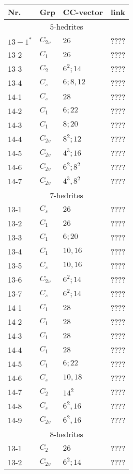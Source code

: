 \documentclass[12pt]{article}
\begin{document}
\begin{table}
\begin{center}
{\small
\begin{minipage}{6cm}
\begin{tabular}{||l|l|l|l||}
\hline
Nr.	&Grp 	&CC-vector	&link\\\hline
\multicolumn{4}{||c||}{$5$-hedrites}\\\hline
$13-1^*$&$C_{2v}$	&$26$		&????\\
13-2	&$C_1$	&$26$		&????\\
13-3	&$C_2$	&$6^2; 14$	&????\\
13-4	&$C_s$	&$6; 8, 12$	&????\\\hline
14-1	&$C_s$	&$28$		&????\\
14-2	&$C_1$	&$6; 22$		&????\\
14-3	&$C_1$	&$8; 20$		&????\\
14-4	&$C_{2v}$	&$8^2; 12$	&????\\
14-5	&$C_{2v}$	&$4^3; 16$	&????\\
14-6	&$C_{2v}$	&$6^2; 8^2$	&????\\
14-7	&$C_{2v}$	&$4^3, 8^2$	&????\\\hline
\hline
\multicolumn{4}{||c||}{$7$-hedrites}\\\hline
13-1	&$C_s$	&$26$		&????\\
13-2	&$C_1$	&$26$		&????\\
13-3	&$C_1$	&$6; 20$		&????\\
13-4	&$C_1$	&$10, 16$		&????\\
13-5	&$C_s$	&$10, 16$		&????\\
13-6	&$C_{2v}$	&$6^2; 14$	&????\\
13-7	&$C_{s}$	&$6^2; 14$	&????\\\hline
14-1	&$C_1$	&$28$		&????\\
14-2	&$C_1$	&$28$		&????\\
14-3	&$C_1$	&$28$		&????\\
14-4	&$C_1$	&$28$		&????\\
14-5	&$C_1$	&$6; 22$		&????\\
14-6	&$C_s$	&$10, 18$		&????\\
14-7	&$C_2$	&$14^2$		&????\\
14-8	&$C_s$	&$6^2, 16$	&????\\
14-9	&$C_{2v}$	&$6^2, 16$	&????\\\hline
\hline
\multicolumn{4}{||c||}{$8$-hedrites}\\\hline
13-1	&$C_2$	&$26$		&????\\
13-2	&$C_{2v}$	&$6^2; 14$	&????\\\hline

\end{tabular}
\end{minipage}}
\end{center}
\end{table}
\end{document}
